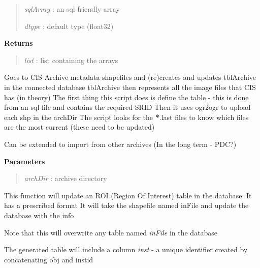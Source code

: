 \documentclass[letterpaper,10pt,english]{sphinxmanual}
\begin{document}
\begin{fulllineitems}
\begin{fulllineitems}
\begin{quote}
\emph{sqlArray} : an sql friendly array

\emph{dtype}    : default type (float32)
\end{quote}

\textbf{Returns}
\begin{quote}

\emph{list}     : list containing the arrays
\end{quote}

\end{fulllineitems}


\begin{fulllineitems}
\label{code:Database.Database.updateFromArchive}
Goes to CIS Archive metadata shapefiles and (re)creates and updates tblArchive in the connected database
tblArchive then represents all the image files that CIS has (in theory)
The first thing this script does is define the table - this is done from an sql file and contains the required SRID
Then it uses ogr2ogr to upload each shp in the archDir 
The script looks for the {\color{red}\bfseries{}*}.last files to know which files are the most current (these need to be updated)

Can be extended to import from other archives (In the long term - PDC?)

\textbf{Parameters}
\begin{quote}

\emph{archDir} : archive directory
\end{quote}

\end{fulllineitems}


\begin{fulllineitems}
\label{code:Database.Database.updateROI}
This function will update an ROI (Region Of Interest) table in the database. It has a prescribed format
It will take the shapefile named inFile and update the database with the info

Note that this will overwrite any table named \emph{inFile} in the database

The generated table will include a column \emph{inst} - a unique identifier created by 
concatenating obj and instid


\end{fulllineitems}
\end{fulllineitems}
\end{document}
